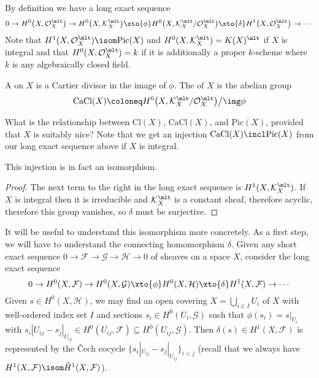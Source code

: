 \documentclass[wip, algebra]{bsteffan-lecturenotes}
\newcommand{\cO}{\mathcal{O}}
\newcommand{\cF}{\mathcal{F}}
\newcommand{\cG}{\mathcal{G}}
\newcommand{\cH}{\mathcal{H}}
\newcommand{\cK}{\mathcal{K}}
\newcommand{\Pic}{\mathrm{Pic}}
\newcommand{\Cl}{\mathrm{Cl}}
\newcommand{\CaCl}{\mathrm{CaCl}}
\begin{document}
By definition we have a long exact sequence
\begin{equation*}
	0 \to H^0\big(X, \cO_X^\mlt\big) \to H^0\big(X, \cK_X^\mlt\big) \xto{\phi} H^0\big(X, \cK_X^\mlt / \cO_X^\mlt\big) \xto{\delta} H^1\big(X, \cO_X^\mlt\big) \to \cdots
\end{equation*}
Note that $H^1(X, \cO_X^\mlt) \isom \Pic(X)$ and $H^0(X, \cK_X^\mlt) = K(X)^\mlt$ if $X$ is integral and that $H^0(X, \cO_X^\mlt) = k$ if it is additionally a proper $k$-scheme where $k$ is any algebraically closed field.
\begin{definition}
	A  on $X$ is a Cartier divisor in the image of $\phi$.
	The  of $X$ is the abelian group
	\begin{equation*}
		\CaCl(X) \coloneq H^0\big(X, \cK_X^\mlt / \cO_X^\mlt\big) \big/ \img \phi
	\end{equation*}
\end{definition}
What is the relationship between $\Cl(X)$, $\CaCl(X)$, and $\Pic(X)$, provided that $X$ is suitably nice? 
Note that we get an injection $\CaCl(X) \incl \Pic(X)$ from our long exact sequence above if $X$ is integral.
\begin{proposition}
	This injection is in fact an isomorphism.
\end{proposition}
\begin{proof}
	The next term to the right in the long exact sequence is $H^1(X, \cK_X^\mlt)$.
	If $X$ is integral then it is irreducible and $\cK_X^\mlt$ is a constant sheaf, therefore acyclic, therefore this group vanishes, so $\delta$ must be surjective.
\end{proof}
It will be useful to understand this isomorphism more concretely.
As a first step, we will have to understand the connecting homomorphism $\delta$.
Given any short exact sequence $0 \to \cF \to \cG \to \cH \to 0$ of sheaves on a space $X$, consider the long exact sequence 
\begin{equation*}
	0 \to H^0(X, \cF) \to H^0(X, \cG) \xto{\phi} H^0(X, \cH) \xto{\delta} H^1(X, \cF) \to \cdots
\end{equation*}
Given $s \in H^0(X, \cH)$, we may find an open covering $X = \bigcup_{i \in I} U_i$ of $X$ with well-ordered index set $I$ and sections $s_i \in H^0(U_i, \cG)$ such that $\phi(s_i) = s|_{U_i}$ with $s_i|U_{{ij}} - s_j|_{U_{ij}} \in H^0(U_{ij}, \cF) \subseteq H^0(U_{ij}, \cG)$.
Then $\delta(s) \in H^1(X, \cF)$ is represented by the Čech cocycle $\{s_i|_{U_{ij}} - s_j|_{U_{ij}}\}_{i < j}$ (recall that we always have $H^1(X, \cF) \isom \check{H}^1(X, \cF)$).
\end{document}
